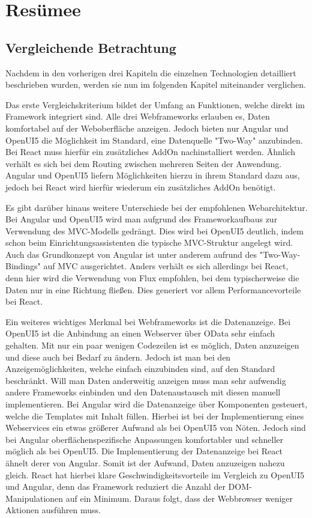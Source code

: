 

\chapter{Resümee}
\section{Vergleichende Betrachtung}

Nachdem in den vorherigen drei Kapiteln die einzelnen Technologien detailliert beschrieben wurden, werden sie nun im folgenden Kapitel miteinander verglichen.

Das erste Vergleichskriterium bildet der Umfang an Funktionen, welche direkt im Framework integriert sind. Alle drei Webframeworks erlauben es, Daten komfortabel auf der Weboberfläche anzeigen. Jedoch bieten nur Angular und OpenUI5 die Möglichkeit im Standard, eine Datenquelle "Two-Way" anzubinden. Bei React muss hierfür ein zusätzliches AddOn nachinstalliert werden. Ähnlich verhält es sich bei dem Routing zwischen mehreren Seiten der Anwendung. Angular und OpenUI5 liefern Möglichkeiten hierzu in ihrem Standard dazu aus, jedoch bei React wird hierfür wiederum ein zusätzliches AddOn benötigt. 

Es gibt darüber hinaus weitere Unterschiede bei der empfohlenen Webarchitektur. Bei Angular und OpenUI5 wird man aufgrund des Frameworkaufbaus zur Verwendung des MVC-Modells gedrängt. Dies wird bei OpenUI5 deutlich, indem schon beim Einrichtungsassistenten die typische MVC-Struktur angelegt wird. Auch das Grundkonzept von Angular ist unter anderem aufrund des "Two-Way-Bindings" auf MVC ausgerichtet. Anders verhält es sich allerdings bei React, denn hier wird die Verwendung von Flux empfohlen, bei dem typischerweise die Daten nur in eine Richtung fließen. Dies generiert vor allem Performancevorteile bei React.

Ein weiteres wichtiges Merkmal bei Webframeworks ist die Datenanzeige. Bei OpenUI5 ist die Anbindung an einen Webserver über OData sehr einfach gehalten. Mit nur ein paar wenigen Codezeilen ist es möglich, Daten anzuzeigen und diese auch bei Bedarf zu ändern. Jedoch ist man bei den Anzeigemöglichkeiten, welche einfach einzubinden sind, auf den Standard beschränkt. Will man Daten anderweitig anzeigen muss man sehr aufwendig andere Frameworks einbinden und den Datenaustausch mit diesen manuell implementieren. Bei Angular wird die Datenanzeige über Komponenten gesteuert, welche die Templates mit Inhalt füllen. Hierbei ist bei der Implementierung eines Webservices ein etwas größerer Aufwand als bei OpenUI5 von Nöten. Jedoch sind bei Angular oberflächenspezifische Anpassungen komfortabler und schneller möglich als bei OpenUI5. Die Implementierung der Datenanzeige bei React ähnelt derer von Angular. Somit ist der Aufwand, Daten anzuzeigen nahezu gleich. React hat hierbei klare Geschwindigkeitsvorteile im Vergleich zu OpenUI5 und Angular, denn das Framework reduziert die Anzahl der DOM-Manipulationen auf ein Minimum. Daraus folgt, dass der Webbrowser weniger Aktionen ausführen muss.

